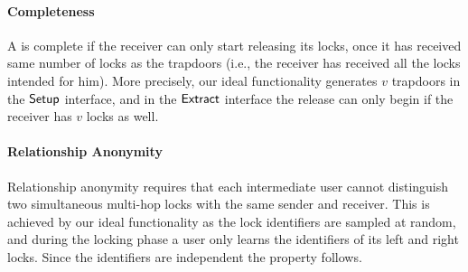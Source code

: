 \paragraph{Completeness} A \sysname is complete if the receiver can only start releasing its 
locks, once it has received same number of locks as the trapdoors (i.e., the receiver has 
received all the locks intended for him). More precisely, our ideal functionality generates 
$v$ trapdoors in the $\mathsf{Setup}$ interface, and in the $\mathsf{Extract}$ interface the release can only 
begin if the receiver has $v$ locks as well.

\paragraph{Relationship Anonymity} Relationship anonymity requires that each intermediate user 
cannot distinguish two simultaneous multi-hop locks with the same sender and receiver. This is 
achieved by our ideal functionality as the lock identifiers are sampled at random, and during 
the locking phase a user only learns the identifiers of its left and right locks. Since the 
identifiers are independent the property follows.


